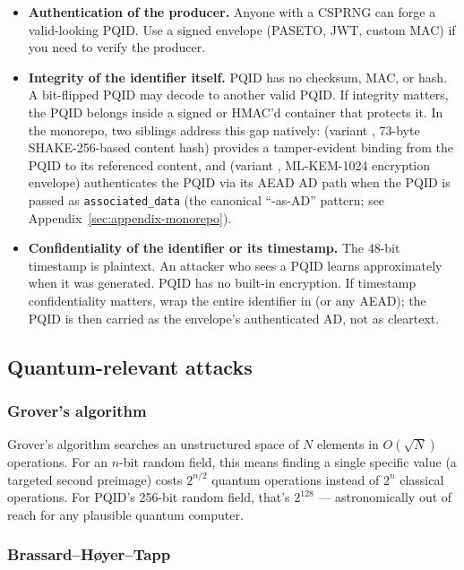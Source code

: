 \begin{itemize}
  \item \textbf{Authentication of the producer.} Anyone with a CSPRNG can forge a valid-looking PQID. Use a signed envelope (PASETO, JWT, custom MAC) if you need to verify the producer.
  \item \textbf{Integrity of the identifier itself.} PQID has no checksum, MAC, or hash. A bit-flipped PQID may decode to another valid PQID. If integrity matters, the PQID belongs inside a signed or HMAC'd \citep{rfc2104} container that protects it. In the \pqtoolkit{} monorepo, two siblings address this gap natively: \pqhash{} (variant , 73-byte SHAKE-256-based content hash) provides a tamper-evident binding from the PQID to its referenced content, and \pqcrypt{} (variant , ML-KEM-1024 encryption envelope) authenticates the PQID via its AEAD AD path when the PQID is passed as \texttt{associated\_data} (the canonical ``\pqid{}-as-AD'' pattern; see Appendix~\ref{sec:appendix-monorepo}).
  \item \textbf{Confidentiality of the identifier or its timestamp.} The 48-bit timestamp is plaintext. An attacker who sees a PQID learns approximately when it was generated. PQID has no built-in encryption. If timestamp confidentiality matters, wrap the entire identifier in \pqcrypt{} (or any AEAD); the PQID is then carried as the envelope's authenticated AD, not as cleartext.
\end{itemize}

\subsection{Quantum-relevant attacks}

\subsubsection{Grover's algorithm \citep{grover1996}}

Grover's algorithm searches an unstructured space of $N$ elements in $O(\sqrt{N})$ operations. For an $n$-bit random field, this means finding a single specific value (a targeted second preimage) costs $2^{n/2}$ quantum operations instead of $2^n$ classical operations. For PQID's 256-bit random field, that's $2^{128}$ --- astronomically out of reach for any plausible quantum computer.

\subsubsection{Brassard--H{\o}yer--Tapp \citep{bht1998}}

